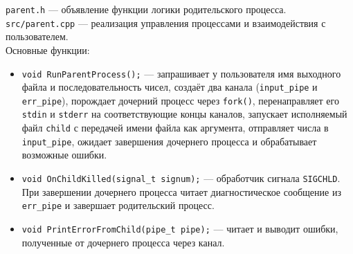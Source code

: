 \vspace{2\baselineskip}
\texttt{parent.h} --- объявление функции логики родительского процесса. \\
\texttt{src/parent.cpp} --- реализация управления процессами и взаимодействия с пользователем. \\
Основные функции:
\begin{itemize}
    \item \texttt{void RunParentProcess();} --- запрашивает у пользователя имя выходного файла и последовательность чисел, создаёт два канала (\texttt{input\_pipe} и \texttt{err\_pipe}), порождает дочерний процесс через \texttt{fork()}, перенаправляет его \texttt{stdin} и \texttt{stderr} на соответствующие концы каналов, запускает исполняемый файл \texttt{child} с передачей имени файла как аргумента, отправляет числа в \texttt{input\_pipe}, ожидает завершения дочернего процесса и обрабатывает возможные ошибки.
    \item \texttt{void OnChildKilled(signal\_t signum);} --- обработчик сигнала \texttt{SIGCHLD}. При завершении дочернего процесса читает диагностическое сообщение из \texttt{err\_pipe} и завершает родительский процесс.
    \item \texttt{void PrintErrorFromChild(pipe\_t pipe);} --- читает и выводит ошибки, полученные от дочернего процесса через канал.
\end{itemize}